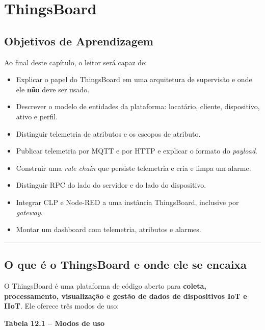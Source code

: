 \chapter{ThingsBoard}\label{thingsboard}

\section*{Objetivos de Aprendizagem}

Ao final deste capítulo, o leitor será capaz de:

\begin{itemize}
\tightlist
\item
  Explicar o papel do ThingsBoard em uma arquitetura de supervisão e onde ele \textbf{não} deve ser usado.
\item
  Descrever o modelo de entidades da plataforma: locatário, cliente, dispositivo, ativo e perfil.
\item
  Distinguir telemetria de atributos e os escopos de atributo.
\item
  Publicar telemetria por MQTT e por HTTP e explicar o formato do \emph{payload}.
\item
  Construir uma \emph{rule chain} que persiste telemetria e cria e limpa um alarme.
\item
  Distinguir RPC do lado do servidor e do lado do dispositivo.
\item
  Integrar CLP e Node-RED a uma instância ThingsBoard, inclusive por \emph{gateway}.
\item
  Montar um dashboard com telemetria, atributos e alarmes.
\end{itemize}

\begin{center}\rule{0.5\linewidth}{0.5pt}\end{center}

\section{O que é o ThingsBoard e onde ele se encaixa}\label{o-que-uxe9-o-thingsboard-e-onde-ele-se-encaixa}

O ThingsBoard é uma plataforma de código aberto para \textbf{coleta, processamento, visualização e gestão de dados de dispositivos IoT e IIoT}. Ele oferece três modos de uso:

\textbf{Tabela 12.1 -- Modos de uso}

